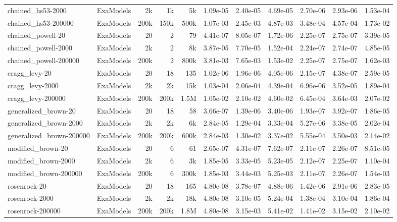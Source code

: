 {\begin{longtable}{@{}ll rrr rrr rr r@{}}
  chained\_hs53-2000 & ExaModels & 2k & 1k & 5k & 1.09e-05 & 2.40e-05 & 4.69e-05 & 2.70e-06 & 2.93e-06 & 1.53e-04 \\
  chained\_hs53-200000 & ExaModels & 200k & 150k & 500k & 1.07e-03 & 2.45e-03 & 4.87e-03 & 3.48e-04 & 4.57e-04 & 1.73e-02 \\
  chained\_powell-20 & ExaModels & 20 & 2 & 79 & 4.41e-07 & 8.05e-07 & 1.72e-06 & 2.25e-07 & 2.75e-07 & 3.39e-05 \\
  chained\_powell-2000 & ExaModels & 2k & 2 & 8k & 3.87e-05 & 7.70e-05 & 1.52e-04 & 2.24e-07 & 2.74e-07 & 4.85e-05 \\
  chained\_powell-200000 & ExaModels & 200k & 2 & 800k & 3.81e-03 & 7.65e-03 & 1.53e-02 & 2.25e-07 & 2.75e-07 & 1.62e-03 \\
  cragg\_levy-20 & ExaModels & 20 & 18 & 135 & 1.02e-06 & 1.96e-06 & 4.05e-06 & 2.15e-07 & 4.38e-07 & 2.59e-05 \\
  cragg\_levy-2000 & ExaModels & 2k & 2k & 15k & 1.03e-04 & 2.06e-04 & 4.39e-04 & 6.96e-06 & 3.52e-05 & 1.89e-04 \\
  cragg\_levy-200000 & ExaModels & 200k & 200k & 1.5M & 1.05e-02 & 2.10e-02 & 4.60e-02 & 6.45e-04 & 3.64e-03 & 2.07e-02 \\
  generalized\_brown-20 & ExaModels & 20 & 18 & 58 & 3.66e-07 & 1.39e-06 & 3.40e-06 & 1.93e-07 & 3.92e-07 & 1.86e-05 \\
  generalized\_brown-2000 & ExaModels & 2k & 2k & 6k & 2.84e-05 & 1.29e-04 & 3.33e-04 & 5.27e-06 & 3.38e-05 & 2.02e-04 \\
  generalized\_brown-200000 & ExaModels & 200k & 200k & 600k & 2.84e-03 & 1.30e-02 & 3.37e-02 & 5.55e-04 & 3.50e-03 & 2.14e-02 \\
  modified\_brown-20 & ExaModels & 20 & 6 & 61 & 2.65e-07 & 4.31e-07 & 7.62e-07 & 2.11e-07 & 2.26e-07 & 8.51e-05 \\
  modified\_brown-2000 & ExaModels & 2k & 6 & 3k & 1.85e-05 & 3.33e-05 & 5.23e-05 & 2.12e-07 & 2.25e-07 & 1.10e-04 \\
  modified\_brown-200000 & ExaModels & 200k & 6 & 300k & 1.85e-03 & 3.44e-03 & 5.25e-03 & 2.11e-07 & 2.26e-07 & 1.54e-03 \\
  rosenrock-20 & ExaModels & 20 & 18 & 165 & 4.80e-08 & 3.78e-07 & 4.88e-06 & 1.42e-06 & 2.91e-06 & 2.83e-05 \\
  rosenrock-2000 & ExaModels & 2k & 2k & 18k & 4.80e-08 & 3.10e-05 & 5.24e-04 & 1.38e-04 & 3.10e-04 & 1.86e-04 \\
  rosenrock-200000 & ExaModels & 200k & 200k & 1.8M & 4.80e-08 & 3.15e-03 & 5.41e-02 & 1.41e-02 & 3.15e-02 & 2.10e-02 \\

\end{longtable}}
